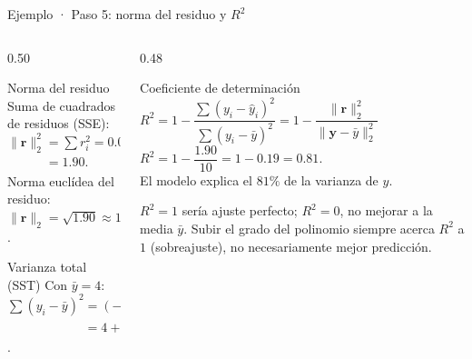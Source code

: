 \documentclass[aspectratio=169,10pt]{beamer}
\begin{document}
\begin{frame}{Ejemplo · Paso 5: norma del residuo y $R^2$}
\begin{columns}[T]
\begin{column}{0.50\textwidth}
\begin{cardgear}{Norma del residuo}{\faCalculator}
{\footnotesize Suma de cuadrados de residuos (SSE):\\[0.4mm]
$\|\mathbf r\|_2^2=\sum r_i^2=0.04+0.01+1.00+0.81+0.04$\\[0.3mm]
$\phantom{\|\mathbf r\|_2^2}=1.90$.\\[1.0mm]
Norma euclídea del residuo:\\[0.3mm]
$\|\mathbf r\|_2=\sqrt{1.90}\approx1.378$.}
\end{cardgear}
\vspace{1mm}
\begin{cardidea}{Varianza total (SST)}{\faSuperscript}
{\footnotesize Con $\bar y=4$:\\[0.3mm]
$\sum(y_i-\bar y)^2=(-2)^2+(-1)^2+1^2+0^2+2^2$\\[0.2mm]
$\phantom{\sum(y_i-\bar y)^2}=4+1+1+0+4=10$.}
\end{cardidea}
\end{column}
\begin{column}{0.48\textwidth}
\begin{cardidea}{Coeficiente de determinación}{\faChartLine}
{\footnotesize $R^2=1-\dfrac{\sum(y_i-\hat y_i)^2}{\sum(y_i-\bar y)^2}=1-\dfrac{\|\mathbf r\|_2^2}{\|\mathbf y-\bar y\|_2^2}$\\[1.4mm]
$R^2=1-\dfrac{1.90}{10}=1-0.19=\boxed{0.81}$.\\[1.2mm]
El modelo explica el $81\%$ de la varianza de $y$.}
\end{cardidea}
\vspace{1mm}
\begin{cardnota}[\faInfoCircle]
{\footnotesize $R^2=1$ sería ajuste perfecto; $R^2=0$, no mejorar a la media $\bar y$. Subir el grado del polinomio siempre acerca $R^2$ a $1$ (sobreajuste), no necesariamente mejor predicción.}
\end{cardnota}
\end{column}
\end{columns}
\end{frame}
\end{document}

